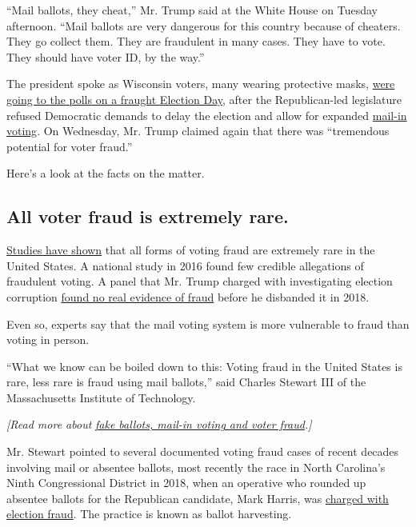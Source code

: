 ``Mail ballots, they cheat,'' Mr. Trump said at the White House on
Tuesday afternoon. ``Mail ballots are very dangerous for this country
because of cheaters. They go collect them. They are fraudulent in many
cases. They have to vote. They should have voter ID, by the way.''

The president spoke as Wisconsin voters, many wearing protective masks,
\href{https://www.nytimes.com/2020/04/07/us/politics/wisconsin-election-coronavirus.html}{were
going to the polls on a fraught Election Day}, after the Republican-led
legislature refused Democratic demands to delay the election and allow
for expanded
\href{https://www.nytimes.com/2020/04/10/us/politics/vote-by-mail.html}{mail-in
voting}. On Wednesday, Mr. Trump claimed again that there was
``tremendous potential for voter fraud.''

Here's a look at the facts on the matter.

\hypertarget{all-voter-fraud-is-extremely-rare}{%
\subsection{All voter fraud is extremely
rare.}\label{all-voter-fraud-is-extremely-rare}}

\href{https://www.nytimes.com/2016/12/18/us/voter-fraud.html}{Studies
have shown} that all forms of voting fraud are extremely rare in the
United States. A national study in 2016 found few credible allegations
of fraudulent voting. A panel that Mr. Trump charged with investigating
election corruption
\href{https://www.nytimes.com/2018/01/03/us/politics/trump-voter-fraud-commission.html}{found
no real evidence of fraud} before he disbanded it in 2018.

Even so, experts say that the mail voting system is more vulnerable to
fraud than voting in person.

``What we know can be boiled down to this: Voting fraud in the United
States is rare, less rare is fraud using mail ballots,'' said Charles
Stewart III of the Massachusetts Institute of Technology.

\emph{{[}Read more about}
\href{https://www.nytimes.com/article/mail-in-vote-fraud-ballot.html}{\emph{fake
ballots, mail-in voting and voter fraud}}\emph{.{]}}

Mr. Stewart pointed to several documented voting fraud cases of recent
decades involving mail or absentee ballots, most recently the race in
North Carolina's Ninth Congressional District in 2018, when an operative
who rounded up absentee ballots for the Republican candidate, Mark
Harris, was
\href{https://www.nytimes.com/2019/07/30/us/mccrae-dowless-indictment.html}{charged
with election fraud}. The practice is known as ballot harvesting.

